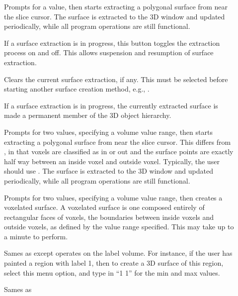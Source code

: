 \begin{description}
\item[]  Prompts for a
    value, then starts extracting a polygonal surface from near the slice
    cursor.  The surface is extracted to the 3D window and updated
    periodically, while all program operations are still functional.
\item[]  If a surface extraction
    is in progress, this button toggles the extraction process on and
    off.  This allows suspension and resumption of surface extraction.
\item[]  Clears the current
    surface extraction, if any.  This must be selected before starting
    another surface creation method, e.g.,
    .
\item[]  If a surface extraction
    is in progress, the currently extracted surface is made a permanent
    member of the 3D object hierarchy.
\item[]  Prompts for two
    values, specifying a volume value range, then starts extracting a
    polygonal surface from near the slice
    cursor.  This differs from ,
    in that voxels are classified as in or out and the surface points are
    exactly half way between an inside voxel and outside voxel.  Typically,
    the user should use .
    The surface is extracted to the 3D window and updated
    periodically, while all program operations are still functional.
\item[]  Prompts for two
    values, specifying a volume value range, then creates a voxelated
    surface.  A voxelated surface is one composed entirely of rectangular
    faces of voxels, the boundaries between inside voxels and outside
    voxels, as defined by the value range specified.  This may take
    up to a minute to perform.
\item[]  Sames as
     except operates on
    the label volume.  For instance, if the user has painted a region
    with label 1, then to create a 3D surface of this region, select
    this menu option, and type in ``1 1'' for the min and max values.
\item[]  Sames as

\end{description}
